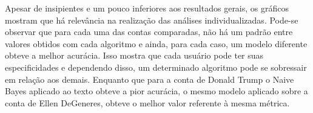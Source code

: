 \documentclass[oneside,openright,12pt]{ufsm_2015} %
\begin{document}
    \par Apesar de insipientes e um pouco inferiores aos resultados gerais, os gráficos mostram que há relevância na realização das análises individualizadas. Pode-se observar que para cada uma das contas comparadas, não há um padrão entre valores obtidos com cada algoritmo e ainda, para cada caso, um modelo diferente obteve a melhor acurácia. Isso mostra que cada usuário pode ter suas especificidades e dependendo disso, um determinado algoritmo pode se sobressair em relação aos demais. Enquanto que para a conta de Donald Trump o Naive Bayes aplicado ao texto obteve a pior acurácia, o mesmo modelo aplicado sobre a conta de Ellen DeGeneres, obteve o melhor valor referente à mesma métrica.
    
    \mydata
    
\end{document}
